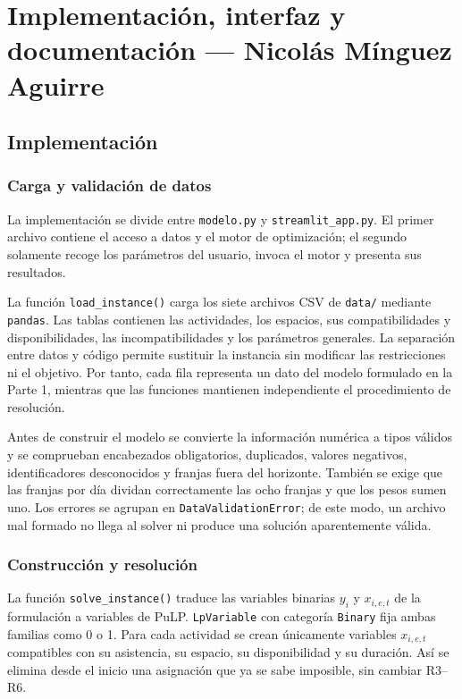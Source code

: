 \section{Implementación, interfaz y documentación --- Nicolás Mínguez Aguirre}

\subsection{Implementación}

\subsubsection{Carga y validación de datos}

La implementación se divide entre \texttt{modelo.py} y
\texttt{streamlit\_app.py}. El primer archivo contiene el acceso a datos y el
motor de optimización; el segundo solamente recoge los parámetros del usuario,
invoca el motor y presenta sus resultados.

La función \texttt{load\_instance()} carga los siete archivos CSV de
\texttt{data/} mediante \texttt{pandas}. Las tablas contienen las actividades,
los espacios, sus compatibilidades y disponibilidades, las incompatibilidades
y los parámetros generales. La separación entre datos y código permite sustituir
la instancia sin modificar las restricciones ni el objetivo. Por tanto, cada
fila representa un dato del modelo formulado en la Parte 1, mientras que las
funciones mantienen independiente el procedimiento de resolución.

Antes de construir el modelo se convierte la información numérica a tipos
válidos y se comprueban encabezados obligatorios, duplicados, valores
negativos, identificadores desconocidos y franjas fuera del horizonte. También
se exige que las franjas por día dividan correctamente las ocho franjas y que
los pesos sumen uno. Los errores se agrupan en \texttt{DataValidationError};
de este modo, un archivo mal formado no llega al solver ni produce una solución
aparentemente válida.

\subsubsection{Construcción y resolución}

La función \texttt{solve\_instance()} traduce las variables binarias
$y_i$ y $x_{i,e,t}$ de la formulación a variables de PuLP. \texttt{LpVariable}
con categoría \texttt{Binary} fija ambas familias como 0 o 1. Para cada
actividad se crean únicamente variables \(x_{i,e,t}\) compatibles con su
asistencia, su espacio, su disponibilidad y su duración. Así se elimina desde
el inicio una asignación que ya se sabe imposible, sin cambiar R3--R6.

